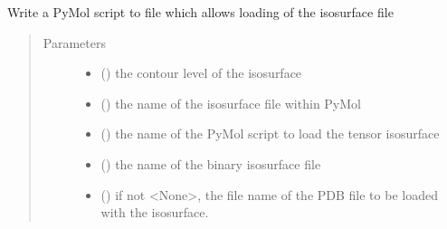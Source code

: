 \documentclass[a4paper,10pt,english,openany,oneside]{sphinxmanual}
\begin{document}
\begin{fulllineitems}
\begin{fulllineitems}
\begin{fulllineitems}
\label{\detokenize{reference/generated/paramagpy.metal.Metal.write_pymol_script:paramagpy.metal.Metal.write_pymol_script}}
Write a PyMol script to file which allows loading of the
isosurface file
\begin{quote}\begin{description}
\item[{Parameters}] \leavevmode\begin{itemize}
\item {} 
 (\sphinxstyleliteralemphasis{\sphinxupquote{ (}}\sphinxstyleliteralemphasis{\sphinxupquote{)}}) \textendash{} the contour level of the isosurface

\item {} 
 (\sphinxstyleliteralemphasis{\sphinxupquote{ (}}\sphinxstyleliteralemphasis{\sphinxupquote{)}}) \textendash{} the name of the isosurface file within PyMol

\item {} 
 (\sphinxstyleliteralemphasis{\sphinxupquote{ (}}\sphinxstyleliteralemphasis{\sphinxupquote{)}}) \textendash{} the name of the PyMol script to load the tensor isosurface

\item {} 
 (\sphinxstyleliteralemphasis{\sphinxupquote{ (}}\sphinxstyleliteralemphasis{\sphinxupquote{)}}) \textendash{} the name of the binary isosurface file

\item {} 
 (\sphinxstyleliteralemphasis{\sphinxupquote{ (}}\sphinxstyleliteralemphasis{\sphinxupquote{)}}) \textendash{} if not \textless{}None\textgreater{}, the file name of the PDB file to be loaded with
the isosurface.


\end{itemize}
\end{description}
\end{quote}
\end{fulllineitems}
\end{fulllineitems}
\end{fulllineitems}
\end{document}

